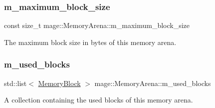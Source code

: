 \subsubsection{\texorpdfstring{m\+\_\+maximum\+\_\+block\+\_\+size}{m\_maximum\_block\_size}}
{\footnotesize\ttfamily const size\+\_\+t mage\+::\+Memory\+Arena\+::m\+\_\+maximum\+\_\+block\+\_\+size\hspace{0.3cm}{\ttfamily [private]}}

The maximum block size in bytes of this memory arena. \hypertarget{classmage_1_1_memory_arena_a49a6d7fb9396f57210897abfb4e30903}{}\label{classmage_1_1_memory_arena_a49a6d7fb9396f57210897abfb4e30903} 
\subsubsection{\texorpdfstring{m\+\_\+used\+\_\+blocks}{m\_used\_blocks}}
{\footnotesize\ttfamily std\+::list$<$ \hyperlink{classmage_1_1_memory_arena_a133e9d40bd216e3f1d98c6a2b36cf373}{Memory\+Block} $>$ mage\+::\+Memory\+Arena\+::m\+\_\+used\+\_\+blocks\hspace{0.3cm}{\ttfamily [private]}}

A collection containing the used blocks of this memory arena. 